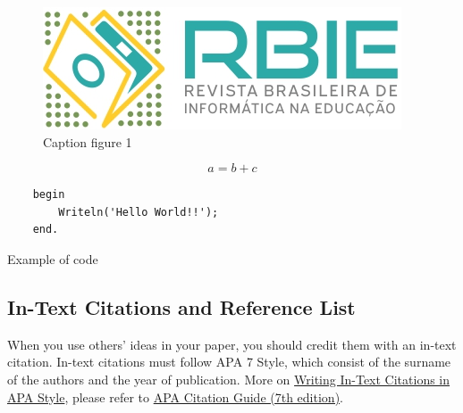 \documentclass[english, spanish, brazilian]{RBIEarticle} %
\begin{document}
    
    \begin{figure}[h]
    	\centerline{\includegraphics[scale=0.25]{newlogo.png}}
    	\caption{Caption figure 1}
    	\label{fig:one}
    \end{figure}

    
    \begin{equation}
    	a = b + c
    	\label{eq:one}
    \end{equation}

    \begin{code}[h]
    	\begin{lstlisting}
    begin
        Writeln('Hello World!!');
    end.
    	\end{lstlisting}
    	\caption{Example of code}
    	\label{code:one}
    \end{code}


    \subsection{In-Text Citations and Reference List}
    
    When you use others' ideas in your paper, you should credit them with an in-text citation. In-text citations must follow APA 7 Style, which consist of the surname of the authors and the year of publication. More on \href{https://apastyle.apa.org/}{Writing In-Text Citations in APA Style}, please refer to \href{https://libguides.brenau.edu/APA7}{APA Citation Guide (7th edition)}.
    
\end{document}
